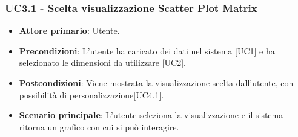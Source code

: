\subsubsection{UC3.1 - Scelta visualizzazione Scatter Plot Matrix}
\begin{itemize}
	\item \textbf{Attore primario}: Utente.
	\item \textbf{Precondizioni}: L'utente ha caricato dei dati nel sistema [UC1] e ha selezionato le dimensioni da utilizzare [UC2].
	\item \textbf{Postcondizioni}: Viene mostrata la visualizzazione  scelta dall'utente, con possibilità di personalizzazione[UC4.1].
	\item \textbf{Scenario principale}: L'utente seleziona la visualizzazione  e il sistema ritorna un grafico con cui si può interagire.
\end{itemize}